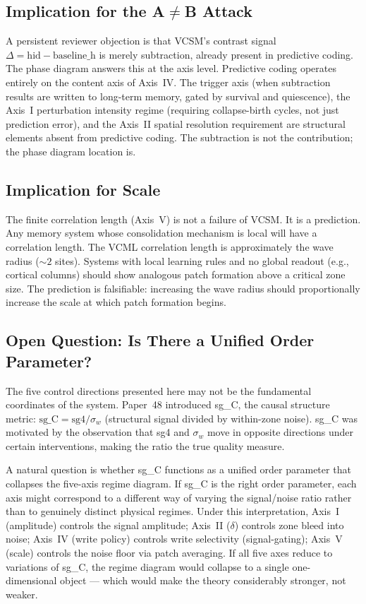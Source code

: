\documentclass[11pt,a4paper]{article}
\begin{document}
\subsection{Implication for the A$\neq$B Attack}

A persistent reviewer objection is that VCSM's contrast signal
$\Delta = \mathrm{hid} - \mathrm{baseline\_h}$ is merely subtraction, already
present in predictive coding.
The phase diagram answers this at the axis level.
Predictive coding operates entirely on the content axis of Axis~IV.
The trigger axis (when subtraction results are written to long-term memory,
gated by survival and quiescence), the Axis~I perturbation intensity regime
(requiring collapse-birth cycles, not just prediction error), and the Axis~II
spatial resolution requirement are structural elements absent from predictive
coding.
The subtraction is not the contribution; the phase diagram location is.

\subsection{Implication for Scale}

The finite correlation length (Axis~V) is not a failure of VCSM.
It is a prediction.
Any memory system whose consolidation mechanism is local will have a
correlation length.
The VCML correlation length is approximately the wave radius ($\sim 2$ sites).
Systems with local learning rules and no global readout (e.g., cortical
columns) should show analogous patch formation above a critical zone size.
The prediction is falsifiable: increasing the wave radius should proportionally
increase the scale at which patch formation begins.

\subsection{Open Question: Is There a Unified Order Parameter?}

The five control directions presented here may not be the fundamental
coordinates of the system.
Paper~48 introduced sg\_C, the causal structure metric:
$\mathrm{sg\_C} = \mathrm{sg4} / \sigma_w$ (structural signal divided by
within-zone noise).
sg\_C was motivated by the observation that sg4 and $\sigma_w$ move in
opposite directions under certain interventions, making the ratio the true
quality measure.

A natural question is whether sg\_C functions as a unified order parameter
that collapses the five-axis regime diagram.
If sg\_C is the right order parameter, each axis might correspond to a
different way of varying the signal/noise ratio rather than to genuinely
distinct physical regimes.
Under this interpretation, Axis~I (amplitude) controls the signal amplitude;
Axis~II ($\delta$) controls zone bleed into noise; Axis~IV (write policy)
controls write selectivity (signal-gating); Axis~V (scale) controls the noise
floor via patch averaging.
If all five axes reduce to variations of sg\_C, the regime diagram would
collapse to a single one-dimensional object --- which would make the theory
considerably stronger, not weaker.
\end{document}
